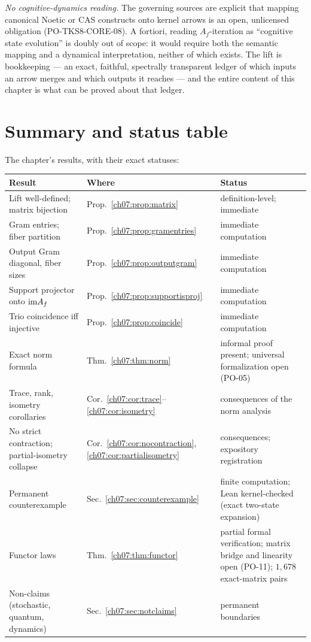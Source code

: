 \emph{No cognitive-dynamics reading.} The governing sources are explicit
that mapping canonical Noetic or CAS constructs onto kernel arrows is an
open, unlicensed obligation (PO-TKS8-CORE-08). A fortiori, reading
$A_f$-iteration as ``cognitive state evolution'' is doubly out of scope:
it would require both the semantic mapping and a dynamical interpretation,
neither of which exists. The lift is bookkeeping --- an exact,
faithful, spectrally transparent ledger of which inputs an arrow merges and
which outputs it reaches --- and the entire content of this chapter is what
can be proved about that ledger.

\section{Summary and status table}\label{ch07:sec:summary}

The chapter's results, with their exact statuses:

\begin{center}
\begin{tabular}{@{}llp{5.2cm}@{}}
\toprule
Result & Where & Status \\
\midrule
Lift well-defined; matrix bijection & Prop.~\ref{ch07:prop:matrix} & definition-level; immediate \\
Gram entries; fiber partition & Prop.~\ref{ch07:prop:gramentries} & immediate computation \\
Output Gram diagonal, fiber sizes & Prop.~\ref{ch07:prop:outputgram} & immediate computation \\
Support projector onto $\mathrm{im} A_f$ & Prop.~\ref{ch07:prop:supportisproj} & immediate computation \\
Trio coincidence iff injective & Prop.~\ref{ch07:prop:coincide} & immediate computation \\
Exact norm formula & Thm.~\ref{ch07:thm:norm} & informal proof present; universal formalization open (PO-05) \\
Trace, rank, isometry corollaries & Cor.~\ref{ch07:cor:trace}--\ref{ch07:cor:isometry} & consequences of the norm analysis \\
No strict contraction; partial-isometry collapse & Cor.~\ref{ch07:cor:nocontraction}, \ref{ch07:cor:partialisometry} & consequences; expository registration \\
Permanent counterexample & Sec.~\ref{ch07:sec:counterexample} & finite computation; Lean kernel-checked (exact two-state expansion) \\
Functor laws & Thm.~\ref{ch07:thm:functor} & partial formal verification; matrix bridge and linearity open (PO-11); $1{,}678$ exact-matrix pairs \\
Non-claims (stochastic, quantum, dynamics) & Sec.~\ref{ch07:sec:notclaims} & permanent boundaries \\
\bottomrule
\end{tabular}
\end{center}

